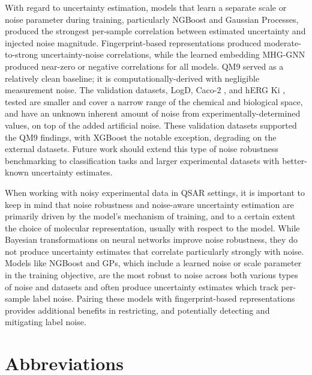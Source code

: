 \documentclass[pdflatex,sn-basic]{sn-jnl}%
\theoremstyle{thmstyleone}%
\theoremstyle{thmstyletwo}%
\theoremstyle{thmstylethree}%
\begin{document}
With regard to uncertainty estimation, models that learn a separate scale or noise parameter during training, particularly NGBoost and Gaussian Processes, produced the strongest per-sample correlation between estimated uncertainty and injected noise magnitude. Fingerprint-based representations produced moderate-to-strong uncertainty-noise correlations, while the learned embedding MHG-GNN produced near-zero or negative correlations for all models. QM9 served as a relatively clean baseline; it is computationally-derived with negligible measurement noise. The validation datasets, LogD, Caco-2 \citep{openadmet}, and hERG Ki \citep{Gaulton2017}, tested are smaller and cover a narrow range of the chemical and biological space, and have an unknown inherent amount of noise from experimentally-determined values, on top of the added artificial noise. These validation datasets supported the QM9 findings, with XGBoost the notable exception, degrading on the external datasets. Future work should extend this type of noise robustness benchmarking to classification tasks and larger experimental datasets with better-known uncertainty estimates.

When working with noisy experimental data in QSAR settings, it is important to keep in mind that noise robustness and noise-aware uncertainty estimation are primarily driven by the model's mechanism of training, and to a certain extent the choice of molecular representation, usually with respect to the model. While Bayesian transformations on neural networks improve noise robustness, they do not produce uncertainty estimates that correlate particularly strongly with noise. Models like NGBoost and GPs, which include a learned noise or scale parameter in the training objective, are the most robust to noise across both various types of noise and datasets and often produce uncertainty estimates which track per-sample label noise. Pairing these models with fingerprint-based representations provides additional benefits in restricting, and potentially detecting and mitigating label noise. 

\section*{Abbreviations}
\end{document}
